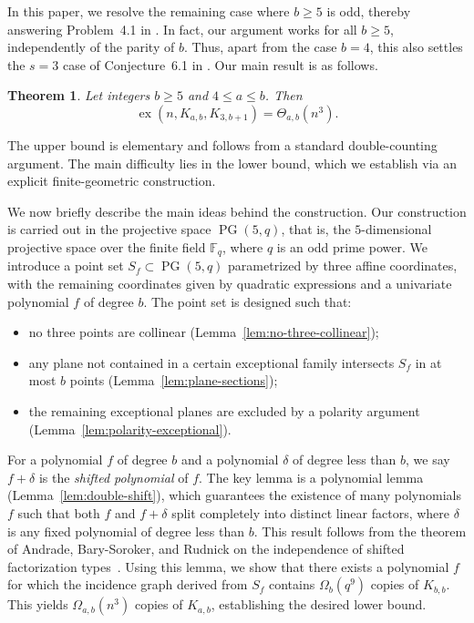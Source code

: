 \documentclass[11pt,a4paper]{article}
\newtheorem{theorem}{Theorem}[section]
\theoremstyle{definition}
\theoremstyle{remark}
\newcommand{\ex}{\operatorname{ex}}
\newcommand{\PG}{\operatorname{PG}}
\begin{document}
In this paper, we resolve the remaining case where $b\geq5$ is odd, thereby answering Problem~4.1 in \cite{hou2026explicit}. In fact, our argument works for all $b\ge 5$, independently of the parity of $b$. Thus,
apart from the case $b=4$, this also settles the $s=3$ case of Conjecture~6.1 in \cite{janzer2026generalized}.
Our main result is as follows. 

\begin{theorem} \label{thm:main}
Let integers $b \geq 5$ and $4 \leq a \leq b$. Then
\begin{equation*}
\ex(n, K_{a,b}, K_{3,b+1}) = \Theta_{a,b}(n^3). 
\end{equation*}
\end{theorem}

The upper bound is elementary and follows from a standard double-counting argument. The main difficulty lies in the lower bound, which we establish via an explicit finite-geometric construction. 

We now briefly describe the main ideas behind the construction. Our construction is carried out in the projective space $\PG(5,q)$, that is, the $5$-dimensional projective space over the finite field $\mathbb{F}_q$, where $q$ is an odd prime power. 
We introduce a point set $S_f \subset \PG(5, q)$ parametrized by three affine coordinates, with the remaining coordinates given by quadratic expressions and a univariate polynomial $f$ of degree $b$. The point set is designed such that: 
\begin{itemize}
  \item no three points are collinear (Lemma~\ref{lem:no-three-collinear});
  \item any plane not contained in a certain exceptional family intersects $S_f$ in at most $b$ points (Lemma~\ref{lem:plane-sections});
  \item  the remaining exceptional planes are excluded by a polarity argument (Lemma~\ref{lem:polarity-exceptional}). 
\end{itemize}

For a polynomial $f$ of degree $b$ and a polynomial  $\delta$ of degree less than $b$, we say $f+\delta$ is the \emph{shifted polynomial} of $f$.
The key lemma is a polynomial lemma (Lemma~\ref{lem:double-shift}), which guarantees the existence of many polynomials $f$ such that both $f$ and $f+\delta$ split completely into distinct linear factors, where $\delta$ is any fixed polynomial of degree less than $b$. 
This result follows from the theorem of Andrade, Bary-Soroker, and Rudnick on the independence of shifted factorization types~\cite{andrade2013shifted}. 
Using this lemma, we show that there exists a polynomial $f$ for which the incidence graph derived from $S_f$ contains $\Omega_b(q^9)$ copies of $K_{b,b}$. This yields $\Omega_{a,b}(n^3)$ copies of $K_{a,b}$, establishing the desired lower bound.
\end{document}
